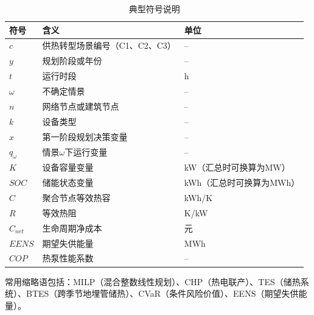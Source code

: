 \documentclass[12pt,a4paper]{article}
\begin{document}
\begin{table}[H]
\centering
\caption{典型符号说明}
\begin{tabular}{p{}p{}p{}}
\toprule
符号 & 含义 & 单位\\
\midrule
$c$ & 供热转型场景编号（C1、C2、C3） & --\\
$y$ & 规划阶段或年份 & --\\
$t$ & 运行时段 & h\\
$\omega$ & 不确定情景 & --\\
$n$ & 网络节点或建筑节点 & --\\
$k$ & 设备类型 & --\\
$x$ & 第一阶段规划决策变量 & --\\
$q_\omega$ & 情景$\omega$下运行变量 & --\\
$K$ & 设备容量变量 & kW（汇总时可换算为MW）\\
$SOC$ & 储能状态变量 & kWh（汇总时可换算为MWh）\\
$C$ & 聚合节点等效热容 & kWh/K\\
$R$ & 等效热阻 & K/kW\\
$C_{net}$ & 生命周期净成本 & 元\\
$EENS$ & 期望失供能量 & MWh\\
$COP$ & 热泵性能系数 & --\\
\bottomrule
\end{tabular}
\end{table}

常用缩略语包括：MILP（混合整数线性规划）、CHP（热电联产）、TES（储热系统）、BTES（跨季节地埋管储热）、CVaR（条件风险价值）、EENS（期望失供能量）。





\end{document}
